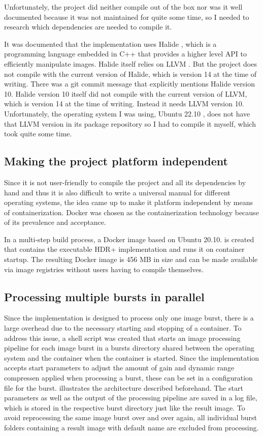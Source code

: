 \documentclass{egpubl}
\begin{document}
Unfortunately, the project did neither compile out of the box 
nor was it well documented because it was not maintained for quite some time, so I 
needed to research which dependencies are needed to compile it.

It was documented that the implementation uses Halide \cite{halide2022}, which is a programming language
embedded in C++ that provides a higher level API to efficiently manipulate images. Halide
itself relies on LLVM \cite{llvm2022}. But the project does not compile with the current version
of Halide, which is version 14 at the time of writing. There was a git commit message
that explicitly mentions Halide version 10. Halide version 10 itself did not compile with
the current version of LLVM, which is version 14 at the time of writing. Instead it needs
LLVM version 10. Unfortunately, the operating system I was using, Ubuntu 22.10 \cite{ubuntu2022}, 
does not have that LLVM version in its package repository so I had to compile it myself, which took
quite some time. 

\subsection{Making the project platform independent}
\label{sec:resolving}

Since it is not user-friendly to compile the project and all its dependencies by hand and thus it 
is also difficult to write a universal manual for different operating systems, the idea came up to 
make it platform independent by means of containerization. Docker was chosen as the containerization 
technology because of its prevalence and acceptance. 

In a multi-step build process, a Docker image based on Ubuntu 20.10. is created that contains the 
executable HDR+ implementation and runs it on container startup. The resulting Docker image is 
456 MB in size and can be made available via image registries without users having to compile themselves.

\subsection{Processing multiple bursts in parallel}
\label{sec:parallel}

Since the implementation is designed to process only one image burst, there is a large overhead 
due to the necessary starting and stopping of a container. To address this issue, a shell script 
was created that starts an image processing pipeline for each image burst in a bursts directory 
shared between the operating system and the container when the container is started. Since the 
implementation accepts start parameters to adjust the amount of gain and dynamic range compressen 
applied when processing a burst, these can be set in a configuration 
file for the burst.  illustrates the architecture described beforehand. 
The start parameters as well as the output of the processing pipeline are saved 
in a log file, which is stored in the respective burst directory just like the result image.
To avoid reprocessing the same image burst over and over again, all individual burst folders containing 
a result image with default name are excluded from processing. 
\end{document}

